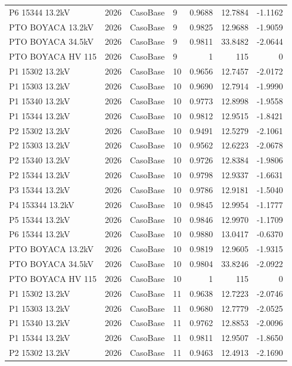 \documentclass[11pt,a4paper]{article}
\begin{document}
\begin{longtable}{llllrrr}
P6 15344 13.2kV & 2026 & CasoBase & 9 & 0.9688 & 12.7884 & -1.1162 \\
PTO BOYACA 13.2kV & 2026 & CasoBase & 9 & 0.9825 & 12.9688 & -1.9059 \\
PTO BOYACA 34.5kV & 2026 & CasoBase & 9 & 0.9811 & 33.8482 & -2.0644 \\
PTO BOYACA HV 115 & 2026 & CasoBase & 9 & 1 & 115 & 0 \\
P1 15302 13.2kV & 2026 & CasoBase & 10 & 0.9656 & 12.7457 & -2.0172 \\
P1 15303 13.2kV & 2026 & CasoBase & 10 & 0.9690 & 12.7914 & -1.9990 \\
P1 15340 13.2kV & 2026 & CasoBase & 10 & 0.9773 & 12.8998 & -1.9558 \\
P1 15344 13.2kV & 2026 & CasoBase & 10 & 0.9812 & 12.9515 & -1.8421 \\
P2 15302 13.2kV & 2026 & CasoBase & 10 & 0.9491 & 12.5279 & -2.1061 \\
P2 15303 13.2kV & 2026 & CasoBase & 10 & 0.9562 & 12.6223 & -2.0678 \\
P2 15340 13.2kV & 2026 & CasoBase & 10 & 0.9726 & 12.8384 & -1.9806 \\
P2 15344 13.2kV & 2026 & CasoBase & 10 & 0.9798 & 12.9337 & -1.6631 \\
P3 15344 13.2kV & 2026 & CasoBase & 10 & 0.9786 & 12.9181 & -1.5040 \\
P4 153344 13.2kV & 2026 & CasoBase & 10 & 0.9845 & 12.9954 & -1.1777 \\
P5 15344 13.2kV & 2026 & CasoBase & 10 & 0.9846 & 12.9970 & -1.1709 \\
P6 15344 13.2kV & 2026 & CasoBase & 10 & 0.9880 & 13.0417 & -0.6370 \\
PTO BOYACA 13.2kV & 2026 & CasoBase & 10 & 0.9819 & 12.9605 & -1.9315 \\
PTO BOYACA 34.5kV & 2026 & CasoBase & 10 & 0.9804 & 33.8246 & -2.0922 \\
PTO BOYACA HV 115 & 2026 & CasoBase & 10 & 1 & 115 & 0 \\
P1 15302 13.2kV & 2026 & CasoBase & 11 & 0.9638 & 12.7223 & -2.0746 \\
P1 15303 13.2kV & 2026 & CasoBase & 11 & 0.9680 & 12.7779 & -2.0525 \\
P1 15340 13.2kV & 2026 & CasoBase & 11 & 0.9762 & 12.8853 & -2.0096 \\
P1 15344 13.2kV & 2026 & CasoBase & 11 & 0.9811 & 12.9507 & -1.8650 \\
P2 15302 13.2kV & 2026 & CasoBase & 11 & 0.9463 & 12.4913 & -2.1690 \\

\end{longtable}
\end{document}
